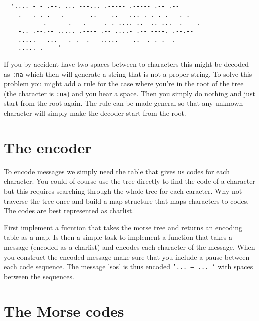 \documentclass[a4paper,11pt]{article}
\begin{document}
\begin{verbatim}
  '.... - - .--. ... ---... .----- .----- .-- .-- 
    .-- .-.-.- -.-- --- ..- - ..- -... . .-.-.- -.-. 
    --- -- .----- .-- .- - -.-. .... ..--.. ...- .----. 
    -.. .--.-- ..... .---- .-- ....- .-- ----. .--.-- 
    ..... --... --. .--.-- ..... ---.. -.-. .--.-- 
    ..... .----'
\end{verbatim}

If you by accident have two spaces between to characters this might be
decoded as {\tt :na} which then will generate a string that is not a
proper string. To solve this problem you might add a rule for the case
where you're in the root of the tree (the character is {\tt :na}) and
you hear a space. Then you simply do nothing and just start from the
root again. The rule can be made general so that any unknown character
will simply make the decoder start from the root.



\section{The encoder}

To encode messages we simply need the table that gives us codes for
each character. You could of course use the tree directly to find the
code of a character but this requires searching through the whole tree
for each caracter. Why not traverse the tree once and build a map structure
that maps characters to codes. The codes are best represented as
charlist. 

First implement a fucntion that takes the morse tree and returns an
encoding table as a map. Is then a simple task to implement a function
that takes a message (encoded as a charlist) and encodes each
character of the message. When you construct the encoded message make
sure that you include a pause between each code sequence. The message
'sos' is thus encoded {\tt '... --- ... '} with spaces between the
sequences.


\pagebreak



\section{The Morse codes}
\end{document}
